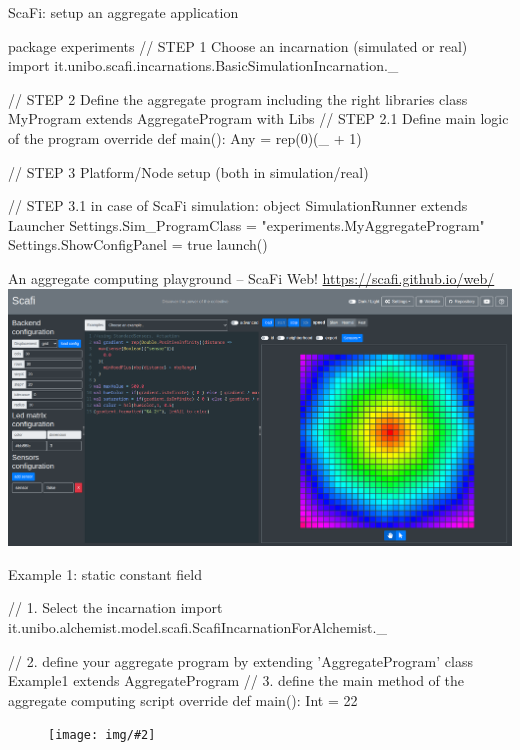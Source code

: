 \documentclass[presentation, 9pt]{beamer}\mode<presentation>{\usetheme{AMSBolognaFC}}
\newcommand{\imgv}[2]{
\begin{figure}
\centering
\texttt{[image: img/\#2]}
\end{figure}
}
\begin{document}
\begin{frame}[fragile]{ScaFi: setup an aggregate application}
\begin{mycode}{}{}{}
package experiments
// STEP 1 Choose an incarnation (simulated or real)
import it.unibo.scafi.incarnations.BasicSimulationIncarnation._

// STEP 2 Define the aggregate program including the right libraries
class MyProgram extends AggregateProgram with Libs {
	// STEP 2.1 Define main logic of the program
	override def main(): Any = rep(0)(_ + 1)
}

// STEP 3 Platform/Node setup (both in simulation/real)

// STEP 3.1 in case of ScaFi simulation:
object SimulationRunner extends Launcher {
  Settings.Sim_ProgramClass = "experiments.MyAggregateProgram"
  Settings.ShowConfigPanel = true
  launch()
}
\end{mycode}
\end{frame}
\begin{frame}{An aggregate computing playground -- ScaFi Web!}
\centering
\url{https://scafi.github.io/web/}
\includegraphics[width=\textwidth]{img/gradient-web.png}
\end{frame}



\begin{frame}[fragile]{Example 1: static constant field}

\begin{mycode}{}{}{}
// 1. Select the incarnation
import it.unibo.alchemist.model.scafi.ScafiIncarnationForAlchemist._

// 2. define your aggregate program by extending 'AggregateProgram'
class Example1 extends AggregateProgram {
  // 3. define the main method of the aggregate computing script
    override def main(): Int = 22
}
\end{mycode}

\imgv{0.6}{example1-static-const-field.png}

\end{frame}
\end{document}
